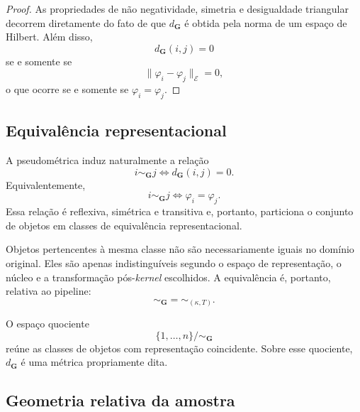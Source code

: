 \begin{proof}
As propriedades de não negatividade, simetria e desigualdade triangular
decorrem diretamente do fato de que $d_{\mathbf{G}}$ é obtida pela norma
de um espaço de Hilbert. Além disso,
\begin{equation*}
    d_{\mathbf{G}}(i,j)
    =
    0
\end{equation*}
se e somente se
\begin{equation*}
    \|
        \varphi_i-\varphi_j
    \|_{\mathcal{E}}
    =
    0,
\end{equation*}
o que ocorre se e somente se
$\varphi_i=\varphi_j$.
\end{proof}

\subsection{Equivalência representacional}
\label{subsec:representational_equivalence}

A pseudométrica induz naturalmente a relação
\begin{equation}\label{eq:representation_equivalence}
    i\sim_{\mathbf{G}}j
    \iff
    d_{\mathbf{G}}(i,j)=0.
\end{equation}
Equivalentemente,
\begin{equation*}
    i\sim_{\mathbf{G}}j
    \iff
    \varphi_i=\varphi_j.
\end{equation*}
Essa relação é reflexiva, simétrica e transitiva e, portanto, particiona o
conjunto de objetos em classes de equivalência representacional.

Objetos pertencentes à mesma classe não são necessariamente iguais no
domínio original. Eles são apenas indistinguíveis segundo o espaço de
representação, o núcleo e a transformação pós-\textit{kernel} escolhidos.
A equivalência é, portanto, relativa ao pipeline:
\begin{equation*}
    \sim_{\mathbf{G}}
    =
    \sim_{(\kappa,T)}.
\end{equation*}

O espaço quociente
\begin{equation}
    \{1,\dots,n\}/{\sim_{\mathbf{G}}}
\end{equation}
reúne as classes de objetos com representação coincidente. Sobre esse
quociente, $d_{\mathbf{G}}$ é uma métrica propriamente dita.

\subsection{Geometria relativa da amostra}
\label{subsec:sample_relative_geometry}

